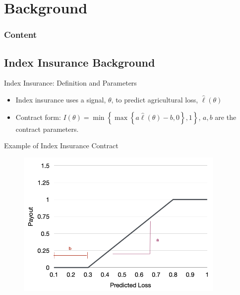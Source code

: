 \documentclass{beamer}
\begin{document}
\section{Background}
\begin{frame}
    \frametitle{Content}
    \tableofcontents[currentsection]
  \end{frame}
\subsection{Index Insurance Background}
\begin{frame}{Index Insurance: Definition and Parameters}
    \begin{itemize}
        \setlength\itemsep{1em}
        \item Index insurance uses a signal, $\theta$, to predict agricultural loss, $\hat{\ell}(\theta)$
        \item Contract form: $I(\theta) = \min \left \{ \max \left \{a\hat{\ell}(\theta) - b,0 \right \}, 1 \right \}$, $a,b$ are the contract parameters.
    \end{itemize}
    \end{frame}
    
    \begin{frame}{Example of Index Insurance Contract}
        \begin{figure}
            \includegraphics[width=0.9\textwidth]{../../../output/figures/Presentation/sample_insurance_contract.png}
        \end{figure}
    \end{frame}
\end{document}
